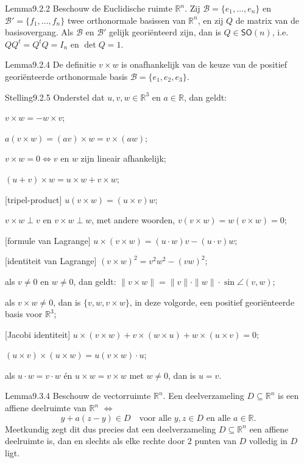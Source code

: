 \begin{res}{Lemma}{9.2.2}
Beschouw de Euclidische ruimte $\mathbb R^n$. Zij $\mathcal B=\{e_1,\dots,e_n\}$ en $\mathcal B'=\{f_1,\dots,f_n\}$ twee orthonormale basissen van $\mathbb R^n$, en zij $Q$ de matrix van de basisovergang. Als $\mathcal B$ en $\mathcal B'$ gelijk geori\"enteerd zijn, dan is $Q\in \mathsf{SO}(n)$, i.e.\ $QQ^t=Q^tQ=I_n$ en $\det Q=1$.
\end{res}

\begin{res}{Lemma}{9.2.4}
De definitie $v\times w$ is onafhankelijk van de keuze van de positief geori\"enteerde orthonormale basis $\mathcal B=\{e_1,e_2,e_3\}$.
\end{res}

\begin{res}{Stelling}{9.2.5}
Onderstel dat $u,v,w\in\mathbb R^3$ en $a\in\mathbb R$, dan geldt:
\begin{myenum}
\item $v\times w=-w\times v$;
\item $a(v\times w)=(av)\times w=v\times(aw)$;
\item $v\times w=0 \iff v$ en $w$ zijn lineair afhankelijk;
\item $(u+v)\times w=u\times w+v\times w$;
\item \textup{[tripel-product]} $u(v\times w)=(u\times v)w$;
\item $v\times w\perp v$ en $v\times w\perp w$, met andere woorden, $v(v\times w)=w(v\times w)=0$;
\item \textup{[formule van Lagrange]} $u\times(v\times w)=(u\cdot w)v-(u\cdot v)w$;
\item \textup{[identiteit van Lagrange]} $(v\times w)^2=v^2w^2-(vw)^2$;
\item als $v\ne0$ en $w\ne0$, dan geldt: $\|v\times w\|=\|v\|\cdot\|w\|\cdot\sin\angle(v,w)$;
\item als $v\times w\ne0$, dan is $\{v,w,v\times w\}$, in deze volgorde, een positief geori\"enteerde basis voor $\mathbb R^3$;
\item \textup{[Jacobi identiteit]} $u\times(v\times w)+v\times(w\times u)+w\times(u\times v)=0$;
\item $(u\times v)\times(u\times w)=u(v\times w)\cdot u$;
\item als $u\cdot w=v\cdot w$ \'en $u\times w=v\times w$ met $w\ne0$, dan is $u=v$.
\end{myenum}
\end{res}

\begin{res}{Lemma}{9.3.4}
Beschouw de vectorruimte $\mathbb R^n$. Een deelverzameling $D\subseteq\mathbb R^n$ is een affiene deelruimte van $\mathbb R^n$ \(\iff\)
\[
y+a(z-y)\in D \quad\text{voor alle } y,z\in D \text{ en alle } a\in\mathbb R. \tag{9.3}
\]
Meetkundig zegt dit dus precies dat een deelverzameling $D\subseteq\mathbb R^n$ een affiene deelruimte is, dan en slechts als elke rechte door 2 punten van $D$ volledig in $D$ ligt.
\end{res}

